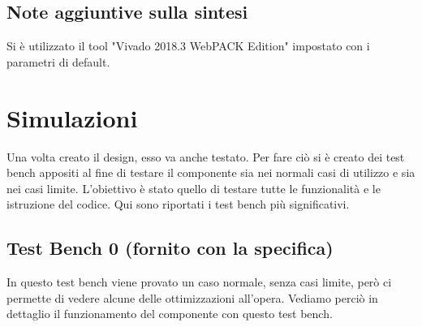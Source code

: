 \documentclass{article}
\begin{document}
\subsection{Note aggiuntive sulla sintesi}
Si è utilizzato il tool "Vivado 2018.3 WebPACK Edition" impostato con i parametri di default.

\vspace{4mm}
\titlerule[0.4pt]


\pagebreak
\section{Simulazioni}
Una volta creato il design, esso va anche testato. Per fare ciò si è creato dei test bench appositi al fine di testare il componente sia nei normali casi di utilizzo e sia nei casi limite. L'obiettivo è stato quello di testare tutte le funzionalità e le istruzione del codice. Qui sono riportati i test bench più significativi.

\subsection{Test Bench 0 (fornito con la specifica)}
In questo test bench viene provato un caso normale, senza casi limite, però ci permette di vedere alcune delle ottimizzazioni all'opera. Vediamo perciò in dettaglio il funzionamento del componente con questo test bench.
\end{document}
